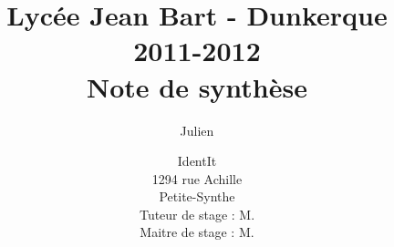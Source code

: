 \documentclass[12pt,a4paper,utf8x]{report}
\title
{
	\normalsize{Lycée Jean Bart - Dunkerque\\
	2011-2012}\\
	\vspace{15mm}
	\Huge{Note de synthèse}
}
\author{\bsc{Stechele} Julien\\
	\vspace{45mm}
}
\date{
	\normalsize{IdentIt\\
    1294 rue Achille \bsc{Pérès}\\
	Petite-Synthe\\
	\vspace{5mm}
    Tuteur de stage : M.\bsc{Anselin}\\
	Maitre de stage : M.\bsc{Dubourg}
	}
}
\begin{document}
\maketitle



\tableofcontents
\clearpage

\begin{onehalfspace}













\end{onehalfspace}
\end{document}
